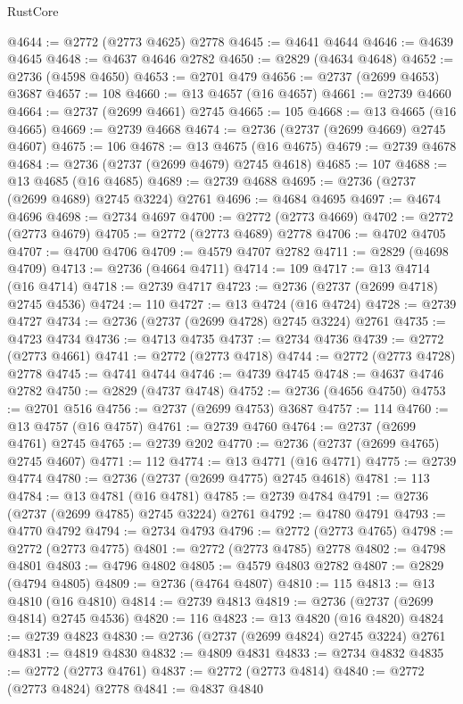 \begin{lexlean}{RustCore}
\begin{coremodule}
@4644 := @2772 (@2773 @4625) @2778
@4645 := @4641 @4644
@4646 := @4639 @4645
@4648 := @4637 @4646 @2782
@4650 := @2829 (@4634 @4648)
@4652 := @2736 (@4598 @4650)
@4653 := @2701 @479
@4656 := @2737 (@2699 @4653) @3687
@4657 := 108
@4660 := @13 @4657 (@16 @4657)
@4661 := @2739 @4660
@4664 := @2737 (@2699 @4661) @2745
@4665 := 105
@4668 := @13 @4665 (@16 @4665)
@4669 := @2739 @4668
@4674 := @2736 (@2737 (@2699 @4669) @2745 @4607)
@4675 := 106
@4678 := @13 @4675 (@16 @4675)
@4679 := @2739 @4678
@4684 := @2736 (@2737 (@2699 @4679) @2745 @4618)
@4685 := 107
@4688 := @13 @4685 (@16 @4685)
@4689 := @2739 @4688
@4695 := @2736 (@2737 (@2699 @4689) @2745 @3224) @2761
@4696 := @4684 @4695
@4697 := @4674 @4696
@4698 := @2734 @4697
@4700 := @2772 (@2773 @4669)
@4702 := @2772 (@2773 @4679)
@4705 := @2772 (@2773 @4689) @2778
@4706 := @4702 @4705
@4707 := @4700 @4706
@4709 := @4579 @4707 @2782
@4711 := @2829 (@4698 @4709)
@4713 := @2736 (@4664 @4711)
@4714 := 109
@4717 := @13 @4714 (@16 @4714)
@4718 := @2739 @4717
@4723 := @2736 (@2737 (@2699 @4718) @2745 @4536)
@4724 := 110
@4727 := @13 @4724 (@16 @4724)
@4728 := @2739 @4727
@4734 := @2736 (@2737 (@2699 @4728) @2745 @3224) @2761
@4735 := @4723 @4734
@4736 := @4713 @4735
@4737 := @2734 @4736
@4739 := @2772 (@2773 @4661)
@4741 := @2772 (@2773 @4718)
@4744 := @2772 (@2773 @4728) @2778
@4745 := @4741 @4744
@4746 := @4739 @4745
@4748 := @4637 @4746 @2782
@4750 := @2829 (@4737 @4748)
@4752 := @2736 (@4656 @4750)
@4753 := @2701 @516
@4756 := @2737 (@2699 @4753) @3687
@4757 := 114
@4760 := @13 @4757 (@16 @4757)
@4761 := @2739 @4760
@4764 := @2737 (@2699 @4761) @2745
@4765 := @2739 @202
@4770 := @2736 (@2737 (@2699 @4765) @2745 @4607)
@4771 := 112
@4774 := @13 @4771 (@16 @4771)
@4775 := @2739 @4774
@4780 := @2736 (@2737 (@2699 @4775) @2745 @4618)
@4781 := 113
@4784 := @13 @4781 (@16 @4781)
@4785 := @2739 @4784
@4791 := @2736 (@2737 (@2699 @4785) @2745 @3224) @2761
@4792 := @4780 @4791
@4793 := @4770 @4792
@4794 := @2734 @4793
@4796 := @2772 (@2773 @4765)
@4798 := @2772 (@2773 @4775)
@4801 := @2772 (@2773 @4785) @2778
@4802 := @4798 @4801
@4803 := @4796 @4802
@4805 := @4579 @4803 @2782
@4807 := @2829 (@4794 @4805)
@4809 := @2736 (@4764 @4807)
@4810 := 115
@4813 := @13 @4810 (@16 @4810)
@4814 := @2739 @4813
@4819 := @2736 (@2737 (@2699 @4814) @2745 @4536)
@4820 := 116
@4823 := @13 @4820 (@16 @4820)
@4824 := @2739 @4823
@4830 := @2736 (@2737 (@2699 @4824) @2745 @3224) @2761
@4831 := @4819 @4830
@4832 := @4809 @4831
@4833 := @2734 @4832
@4835 := @2772 (@2773 @4761)
@4837 := @2772 (@2773 @4814)
@4840 := @2772 (@2773 @4824) @2778
@4841 := @4837 @4840

\end{coremodule}
\end{lexlean}
